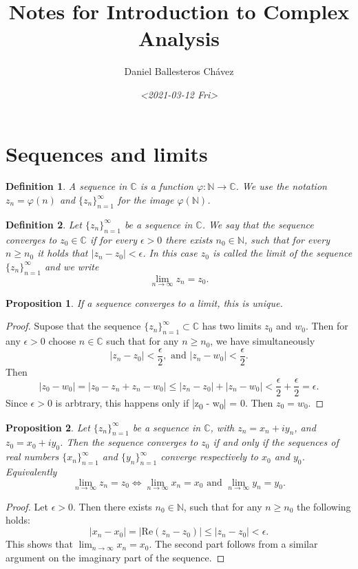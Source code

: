 \documentclass{amsart}
\author{Daniel Ballesteros Chávez}
\date{\textit{<2021-03-12 Fri>}}
\title{Notes for Introduction to Complex Analysis}
\newtheorem{prop}{Proposition}
\newtheorem{mydef}{Definition}
\begin{document}
\maketitle
\tableofcontents





\section{Sequences and limits}
\label{sec:org0255044}

\begin{mydef}
A sequence in \(\mathbb{C}\) is a function \(\varphi: \mathbb{N}\to \mathbb{C}\). We use the notation
\(z_n = \varphi(n)\) and \(\{z_n\}_{n=1}^{\infty}\) for the image \(\varphi(\mathbb{N})\).
\end{mydef}


\begin{mydef}
Let \(\{z_n\}_{n=1}^{\infty}\) be a sequence in \(\mathbb{C}\). We say that the sequence converges to \(z_0\in \mathbb{C}\)
if for every \(\epsilon >0\) there exists \(n_0\in \mathbb{N}\), such that for every \(n\geq n_0\) it holds that \(|z_n - z_0| < \epsilon\). In this case
\(z_0\) is called the limit of the sequence \(\{z_n\}_{n=1}^{\infty}\) and we write
\[ \lim_{n\to\infty} z_n = z_0. \]
\end{mydef}

\begin{prop}
If a sequence converges to a limit, this is unique.
\end{prop}
\begin{proof}
Supose that the sequence \(\{z_n\}_{n=1}^{\infty}\subset \mathbb{C}\) has two limits \(z_0\) and \(w_0\). Then for any \(\epsilon >0\) choose \(n\in \mathbb{C}\) such that for any \(n\geq n_0\), 
we have simultaneously \[ |z_n  - z_0| < \frac{\epsilon}{2}, \mbox{ and } |z_n - w_0 | < \frac{\epsilon}{2}. \] 
Then
\[ | z_0 - w_0 | = |z_0 - z_n + z_n - w_0 | \leq | z_n - z_0 | + | z_n - w_0| < \frac{\epsilon}{2} + \frac{\epsilon}{2} = \epsilon. \]
Since \(\epsilon >0\) is arbtrary, this happens only if |z\textsubscript{0} - w\textsubscript{0}|  = 0. Then \(z_0 = w_0\).
\end{proof}


\begin{prop}
Let \(\{z_n\}_{n=1}^{\infty}\) be a sequence in \(\mathbb{C}\), with \(z_n = x_n + i y_n\), and \(z_0 = x_0 + iy_0\). Then 
the sequence converges to \(z_0\) if and only if the sequences of real numbers \(\{x_n\}_{n=1}^{\infty}\) and \(\{y_n\}_{n=1}^{\infty}\) converge respectively to \(x_0\) and \(y_0\). Equivalently
\[ \lim_{n\to\infty}z_n = z_0 \iff \lim_{n\to\infty}x_n = x_0 \mbox{ and } \lim_{n\to\infty}y_n = y_0. \]
\end{prop}
\begin{proof}
Let \(\epsilon >0\). Then there exists \(n_0 \in \mathbb{N}\), such that for any \(n\geq n_0\) the following holds:
\[ |x_n - x_0 | = | \mbox{Re}(z_n - z_0) | \leq |z_n - z_0 | < \epsilon. \]
This shows that \(\lim_{n\to \infty} x_n = x_0\). The second part follows from a similar argument on the imaginary part of the sequence.
\end{proof}
\end{document}
